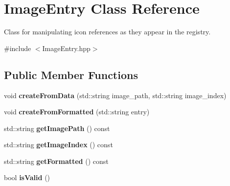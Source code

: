 \hypertarget{class_image_entry}{}\section{Image\+Entry Class Reference}
\label{class_image_entry}


Class for manipulating icon references as they appear in the registry.  




{\ttfamily \#include $<$Image\+Entry.\+hpp$>$}

\subsection*{Public Member Functions}
\begin{DoxyCompactItemize}
\item 
\hypertarget{class_image_entry_a8e54a47819f25e6ee7e76273503b8744}{}void {\bfseries create\+From\+Data} (std\+::string image\+\_\+path, std\+::string image\+\_\+index)\label{class_image_entry_a8e54a47819f25e6ee7e76273503b8744}

\item 
\hypertarget{class_image_entry_afe824b1530ab4b33ece3132b2e0a78e8}{}void {\bfseries create\+From\+Formatted} (std\+::string entry)\label{class_image_entry_afe824b1530ab4b33ece3132b2e0a78e8}

\item 
\hypertarget{class_image_entry_acc882273f2d2c87d742f01efc5807bf5}{}std\+::string {\bfseries get\+Image\+Path} () const \label{class_image_entry_acc882273f2d2c87d742f01efc5807bf5}

\item 
\hypertarget{class_image_entry_a4a621dcaffe09aee7ada966d46705cbc}{}std\+::string {\bfseries get\+Image\+Index} () const \label{class_image_entry_a4a621dcaffe09aee7ada966d46705cbc}

\item 
\hypertarget{class_image_entry_ac7d77251bdb581de36cd3dae3d9e0c1d}{}std\+::string {\bfseries get\+Formatted} () const \label{class_image_entry_ac7d77251bdb581de36cd3dae3d9e0c1d}

\item 
\hypertarget{class_image_entry_acd053af5a4af1443443e3863f1df9b37}{}bool {\bfseries is\+Valid} ()\label{class_image_entry_acd053af5a4af1443443e3863f1df9b37}

\end{DoxyCompactItemize}
